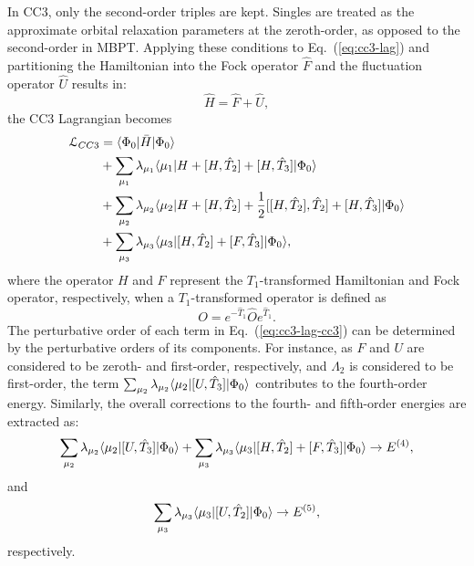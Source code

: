 In CC3, only the second-order triples are kept. Singles are treated as the approximate orbital relaxation parameters at the zeroth-order, as opposed to the second-order in MBPT. Applying these conditions to Eq.~(\ref{eq:cc3-lag}) and partitioning the Hamiltonian into the Fock operator $\hat{F}$ and the fluctuation operator $\hat{U}$ results in:
\begin{equation}
\hat{H} =  \hat{F} + \hat{U},
\label{eq:cc3-h}
\end{equation}
the CC3 Lagrangian becomes
\begin{align}
\begin{split}
\mathcal{L}_{CC3} &= \langle\Phi_{0} |\bar{H}| \Phi_{0} \rangle \\
&+ \sum_{\mu_{1}}\lambda_{\mu_{1}}\langle\mu_{1} |H + [H, \hat{T}_{2}] + [H, \hat{T}_{3}] | \Phi_{0} \rangle \\
&+ \sum_{\mu_{2}}\lambda_{\mu_{2}}\langle\mu_{2} |H + [H, \hat{T}_{2}] + \frac{1}{2}[[H, \hat{T}_{2}], \hat{T}_{2}] + [H, \hat{T}_{3}] | \Phi_{0} \rangle \\
&+ \sum_{\mu_{3}}\lambda_{\mu_{3}}\langle\mu_{3} |[H, \hat{T}_{2}] + [F, \hat{T}_{3}] | \Phi_{0} \rangle,
\label{eq:cc3-lag-cc3}
\end{split}
\end{align} 
where the operator $H$ and $F$ represent the $T_{1}$-transformed Hamiltonian and Fock operator, respectively, when a $T_{1}$-transformed operator is defined as
\begin{equation}
O = e^{-\hat{T}_{1}}\hat{O}e^{\hat{T}_{1}}.
\end{equation}
The perturbative order of each term in Eq.~(\ref{eq:cc3-lag-cc3}) can be determined by the perturbative orders of its components. For instance, as $F$ and $U$ are considered to be zeroth- and first-order, respectively, and $\Lambda_{2}$ is considered to be first-order, the term $\sum_{\mu_{2}}\lambda_{\mu_{2}}\langle\mu_{2} |[U, \hat{T}_{3}]| \Phi_{0} \rangle$ contributes to the fourth-order energy. Similarly, the overall corrections to the fourth- and fifth-order energies are extracted as:
\begin{equation}
 \sum_{\mu_{2}}\lambda_{\mu_{2}}\langle\mu_{2} |[U, \hat{T}_{3}]| \Phi_{0} \rangle + 
 \sum_{\mu_{3}}\lambda_{\mu_{3}}\langle\mu_{3} |[H, \hat{T}_{2}] + [F, \hat{T}_{3}]| \Phi_{0} \rangle
  \rightarrow E^{(4)},
\end{equation}
and
\begin{equation}
 \sum_{\mu_{3}}\lambda_{\mu_{3}}\langle\mu_{3} |[U, \hat{T}_{2}]| \Phi_{0} \rangle
  \rightarrow E^{(5)},
\end{equation}
respectively.

